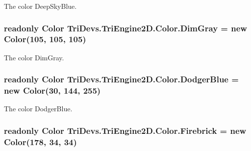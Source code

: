 The color Deep\-Sky\-Blue. 

\hypertarget{struct_tri_devs_1_1_tri_engine2_d_1_1_color_ab33b472ebad9602c52c0a4b87f04ff10}{
\subsubsection[{Dim\-Gray}]{\setlength{\rightskip}{0pt plus 5cm}readonly {\bf Color} Tri\-Devs.\-Tri\-Engine2\-D.\-Color.\-Dim\-Gray = new {\bf Color}(105, 105, 105)\hspace{0.3cm}{\ttfamily [static]}}}\label{struct_tri_devs_1_1_tri_engine2_d_1_1_color_ab33b472ebad9602c52c0a4b87f04ff10}


The color Dim\-Gray. 

\hypertarget{struct_tri_devs_1_1_tri_engine2_d_1_1_color_a7dfbb09ef53b56b3500adabd1e7cb051}{
\subsubsection[{Dodger\-Blue}]{\setlength{\rightskip}{0pt plus 5cm}readonly {\bf Color} Tri\-Devs.\-Tri\-Engine2\-D.\-Color.\-Dodger\-Blue = new {\bf Color}(30, 144, 255)\hspace{0.3cm}{\ttfamily [static]}}}\label{struct_tri_devs_1_1_tri_engine2_d_1_1_color_a7dfbb09ef53b56b3500adabd1e7cb051}


The color Dodger\-Blue. 

\hypertarget{struct_tri_devs_1_1_tri_engine2_d_1_1_color_a119b65cf9ddbada206b89376bf2bd5e7}{
\subsubsection[{Firebrick}]{\setlength{\rightskip}{0pt plus 5cm}readonly {\bf Color} Tri\-Devs.\-Tri\-Engine2\-D.\-Color.\-Firebrick = new {\bf Color}(178, 34, 34)\hspace{0.3cm}{\ttfamily [static]}}}\label{struct_tri_devs_1_1_tri_engine2_d_1_1_color_a119b65cf9ddbada206b89376bf2bd5e7}


